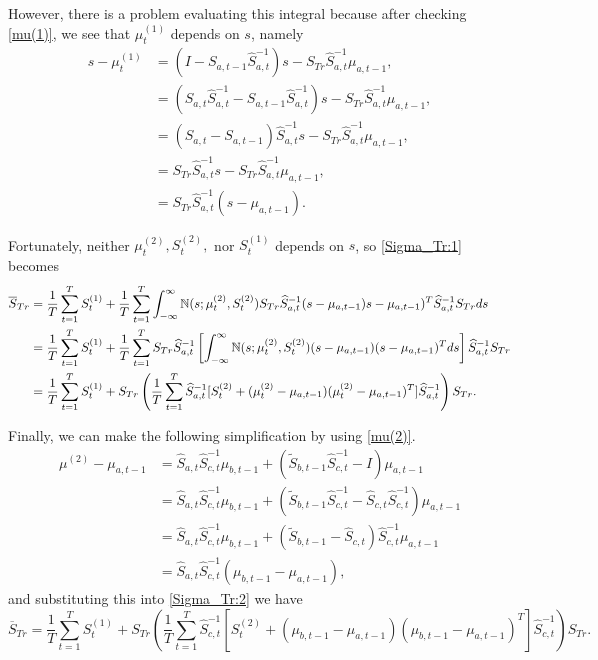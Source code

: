 \documentclass[12pt,leqno]{article}
\begin{document}
However, there is a problem evaluating this integral because after checking \eqref{mu(1)}, we see that $\mu^{(1)}_t$
depends on $s$, namely  
\begin{equation}\label{s-mu_1}
    \begin{split}
s - \mu^{(1)}_t &= (I - S_{a,t-1}\widehat{S}_{a,t}^{-1})s - S_{Tr}\widehat{S}_{a,t}^{-1}\mu_{a,t-1}, \\
  &= (\widehat{S}_{a,t}\widehat{S}_{a,t}^{-1} - S_{a,t-1}\widehat{S}_{a,t}^{-1})s  - 
  S_{Tr}\widehat{S}_{a,t}^{-1}\mu_{a,t-1},\\
  &= (\widehat{S}_{a,t} - S_{a,t-1})\widehat{S}_{a,t}^{-1}s - S_{Tr}\widehat{S}_{a,t}^{-1}\mu_{a,t-1},\\
  &= S_{Tr}\widehat{S}_{a,t}^{-1}s - S_{Tr}\widehat{S}_{a,t}^{-1}\mu_{a,t-1},\\
  &= S_{Tr}\widehat{S}_{a,t}^{-1}(s - \mu_{a,t-1}).
    \end{split}
\end{equation}


Fortunately, neither $\mu^{(2)}_t,S^{(2)}_t,$ nor $S^{(1)}_t$ depends on $s$,
so \eqref{Sigma_Tr:1} becomes
\begin{align}
  \overline{S}_{Tr} &= \frac{1}{T}\sum_{t=1}^TS^{(1)}_t + \frac{1}{T}\sum_{t=1}^T
    \int_{-\infty}^{\infty}{\mathbb N}(s;\mu^{(2)}_t,S^{(2)}_t)S_{Tr}\widehat{S}_{a,t}^{-1}(s-\mu_{a,t-1})
    s-\mu_{a,t-1})^T\widehat{S}_{a,t}^{-1}S_{Tr}ds\notag\\
    &=\frac{1}{T}\sum_{t=1}^TS^{(1)}_t +\frac{1}{T}\sum_{t=1}^TS_{Tr}\widehat{S}_{a,t}^{-1}
    \left[\int_{-\infty}^{\infty}{\mathbb N}(s;\mu^{(2)}_t,S^{(2)}_t)(s-\mu_{a,t-1})(s-\mu_{a,t-1})^Tds\right]\widehat{S}_{a,t}^{-1}S_{Tr}\notag\\
   &=\frac{1}{T}\sum_{t=1}^TS^{(1)}_t+S_{Tr}\left(\frac{1}{T}\sum_{t=1}^T\widehat{S}_{a,t}^{-1}
   [S^{(2)}_t+(\mu^{(2)}_t-\mu_{a,t-1})(\mu^{(2)}_t-\mu_{a,t-1})^T]\widehat{S}_{a,t}^{-1}\right)S_{Tr}.\label{Sigma_Tr:2}
  \end{align}

Finally, we can make the following simplification by using \eqref{mu(2)}.
\begin{align*}
  \mu^{(2)} - \mu_{a,t-1} &= \widehat{S}_{a,t}\widehat{S}_{c,t}^{-1}\mu_{b,t-1} +
  (\widetilde{S}_{b,t-1}\widehat{S}_{c,t}^{-1}-I)\mu_{a,t-1}\\
  &= \widehat{S}_{a,t}\widehat{S}_{c,t}^{-1}\mu_{b,t-1} +
  (\widetilde{S}_{b,t-1}\widehat{S}_{c,t}^{-1}-\widehat{S}_{c,t}\widehat{S}_{c,t}^{-1})\mu_{a,t-1}\\
  &=  \widehat{S}_{a,t}\widehat{S}_{c,t}^{-1}\mu_{b,t-1} +
  (\widetilde{S}_{b,t-1}-\widehat{S}_{c,t})\widehat{S}_{c,t}^{-1}\mu_{a,t-1}\\
  &= \widehat{S}_{a,t}\widehat{S}_{c,t}^{-1}(\mu_{b,t-1} -\mu_{a,t-1}),
\end{align*}
and substituting this into \eqref{Sigma_Tr:2} we have
\begin{equation}\label{Sigma_Tr:3}
\overline{S}_{Tr}   =\frac{1}{T}\sum_{t=1}^TS^{(1)}_t+S_{Tr}\left(\frac{1}{T}\sum_{t=1}^T\widehat{S}_{c,t}^{-1}
   [S^{(2)}_t+(\mu_{b,t-1}-\mu_{a,t-1})(\mu_{b,t-1}-\mu_{a,t-1})^T]\widehat{S}_{c,t}^{-1}\right)S_{Tr}.
\end{equation}  
\end{document}
